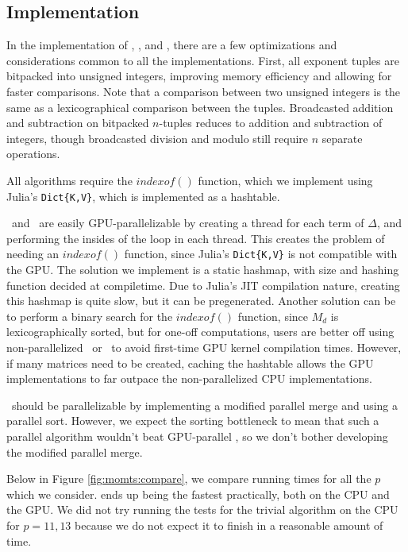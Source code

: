 \subsection{Implementation}

In the implementation of \triv, \merge, and \wics, there are a few optimizations and considerations common to all the implementations.
First, all exponent tuples are bitpacked into unsigned integers, improving memory efficiency and allowing for faster comparisons.
Note that a comparison between two unsigned integers is the same as a lexicographical comparison between the tuples.
Broadcasted addition and subtraction on bitpacked $n$-tuples reduces to addition and subtraction of integers, though broadcasted division and modulo still require $n$ separate operations.

All algorithms require the $indexof()$ function, which we implement using Julia's \texttt{Dict\{K,V\}}, which is implemented as a hashtable.

\triv ~and \wics ~are easily GPU-parallelizable by creating a thread for each term of $\Delta$, and performing the insides of the loop in each thread.
This creates the problem of needing an $indexof()$ function, since Julia's \texttt{Dict\{K,V\}} is not compatible with the GPU.
The solution we implement is a static hashmap, with size and hashing function decided at compiletime.
Due to Julia's JIT compilation nature, creating this hashmap is quite slow, but it can be pregenerated.
Another solution can be to perform a binary search for the $indexof()$ function, since $M_d$ is lexicographically sorted, but for one-off computations, users are better off using non-parallelized \merge ~or \wics ~to avoid first-time GPU kernel compilation times.
However, if many matrices need to be created, caching the hashtable allows the GPU implementations to far outpace the non-parallelized CPU implementations.

\merge ~should be parallelizable by implementing a modified parallel merge and using a parallel sort. 
However, we expect the sorting bottleneck to mean that such a parallel algorithm wouldn't beat GPU-parallel \wics,
so we don't bother developing the modified parallel merge.

Below in Figure \ref{fig:momts:compare}, we compare running times 
for all the \(p\) which we consider. 
\wics ends up being the fastest practically, both on the CPU and the
GPU.
We did not try running the tests for the trivial algorithm on the 
CPU for \(p=11,13\) because we do not expect it to finish in a reasonable
amount of time.

